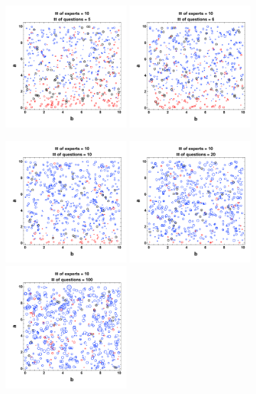 \documentclass[preprintnumbers,aps,prd,floatfix,nofootinbib,onecolumn]{revtex4}
\begin{document}
\begin{figure}[]
	\centering
	\includegraphics[width=0.4\textwidth]{../phase_try_red_q-5_1.pdf}
	\includegraphics[width=0.4\textwidth]{../phase_try_red_q-6_1.pdf}
\end{figure}
\begin{figure}[]
	\centering
	\includegraphics[width=0.4\textwidth]{../phase_try_red_q-10_1.pdf}
	\includegraphics[width=0.4\textwidth]{../phase_try_red_q-20_1.pdf}
	\includegraphics[width=0.4\textwidth]{../phase_try_red_q-100_1.pdf}	
\end{figure}
\end{document}
